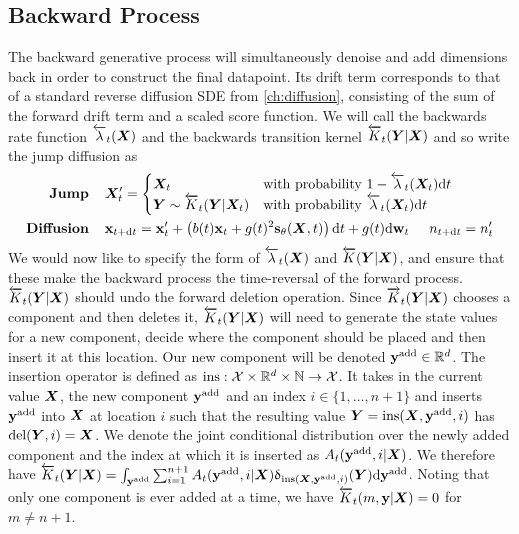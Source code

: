 \subsection{Backward Process}
The backward generative process will simultaneously denoise and add dimensions back in order to construct the final datapoint. Its drift term corresponds to that of a standard reverse diffusion SDE from \cref{ch:diffusion}, consisting of the sum of the forward drift term and a scaled score function. We will call the backwards rate function $\overleftarrow{\lambda}_t({\bm{X}})$ and the backwards transition kernel $\overleftarrow{K}_t({\bm{Y}} | {\bm{X}})$ and so write the jump diffusion as
\begin{align}
    \label{eq:tddm-reverse-jump}
    \textbf{Jump} \hspace{.4cm} & {\bm{X}}_t' = \begin{cases}
        {\bm{X}}_t & \text{with probability } 1 - \overleftarrow{\lambda}_t({\bm{X}}_t) \mathrm{d} t \\
        {\bm{Y}} \sim \overleftarrow{K}_t( {\bm{Y}} |{\bm{X}}_t) & \text{with probability } \overleftarrow{\lambda}_t({\bm{X}}_t) \mathrm{d} t
    \end{cases} 
    \\
    \label{eq:tddm-reverse-diffusion}
    \textbf{Diffusion} \hspace{.4cm} &{\mathbf{x}}_{t+ \mathrm{d} t} = {\mathbf{x}}'_t + \left(b(t){\mathbf{x}}_t + g(t)^2 {\mathbf{s}}_\theta({\bm{X}}, t) \right) \mathrm{d} t + g(t) \mathrm{d} \mathbf{w}_t \hspace{.5cm} n_{t+\mathrm{d} t} = n_t'
\end{align}
We would now like to specify the form of $\overleftarrow{\lambda}_t({\bm{X}})$ and $\overleftarrow{K}({\bm{Y}}|{\bm{X}})$, and ensure that these make the backward process the time-reversal of the forward process. 
$\overleftarrow{K}_t({\bm{Y}} | {\bm{X}})$ should undo the forward deletion operation. Since $\overrightarrow{K}_t({\bm{Y}} | {\bm{X}})$ chooses a component and then deletes it, $\overleftarrow{K}_t({\bm{Y}} | {\bm{X}})$ will need to generate the state values for a new component, decide where the component should be placed and then insert it at this location. 
Our new component will be denoted $\mathbf{y}^{\textup{add}} \in \mathbb{R}^{d}$. 
The insertion operator is defined as $\text{ins}: {\mathcal{X}} \times \mathbb{R}^{d} \times \mathbb{N} \rightarrow {\mathcal{X}}$. It takes in the current value ${\bm{X}}$, the new component $\mathbf{y}^{\textup{add}}$ and an index $i \in \{1, \dots, n+1\}$ and inserts $\mathbf{y}^{\textup{add}}$ into ${\bm{X}}$ at location $i$ such that the resulting value ${\bm{Y}} = \text{ins}({\bm{X}}, \mathbf{y}^{\textup{add}}, i)$ has $\text{del}({\bm{Y}}, i) = {\bm{X}}$.
We denote the joint conditional distribution over the newly added component and the index at which it is inserted as $A_t(\mathbf{y}^{\textup{add}}, i | {\bm{X}})$.
We therefore have $\overleftarrow{K}_t({\bm{Y}} | {\bm{X}}) = \int_{\mathbf{y}^{\textup{add}}} \sum_{i=1}^{n+1}  A_t(\mathbf{y}^{\textup{add}}, i | {\bm{X}}) \updelta_{\text{ins}({\bm{X}}, \mathbf{y}^{\textup{add}}, i)}({\bm{Y}}) \mathrm{d} \mathbf{y}^{\textup{add}}$. Noting that only one component is ever added at a time, we have $\overleftarrow{K}_t(m, {\mathbf{y}} | {\bm{X}}) = 0$ for $m \neq n+1$. 

